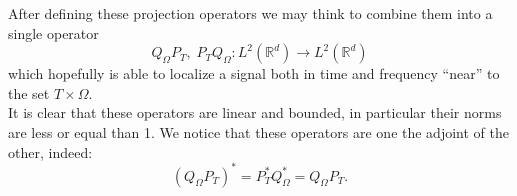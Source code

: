 \documentclass[corpo=11pt, stile=classica, tipotesi=custom,
greek, evenboxes, english]{toptesi}
\numberwithin{equation}{chapter}
\theoremstyle{remark}
\newcommand{\R}{\mathbb{R}} %
\begin{document}
After defining these projection operators we may think to combine them into a single operator
\begin{equation*}\label{composition of projections}
	Q_{\Omega} P_T, \; P_T Q_{\Omega} : L^2(\R^d) \rightarrow L^2(\R^d)
\end{equation*}
which hopefully is able to localize a signal both in time and frequency ``near'' to the set $T \times \Omega$.\\
It is clear that these operators are linear and bounded, in particular their norms are less or equal than 1. We notice that these operators are one the adjoint of the other, indeed:
\begin{equation}\label{projection operators adjoint}
	(Q_{\Omega} P_T)^* = P_T^* Q_{\Omega}^* = Q_{\Omega} P_T.
\end{equation}
\end{document}
